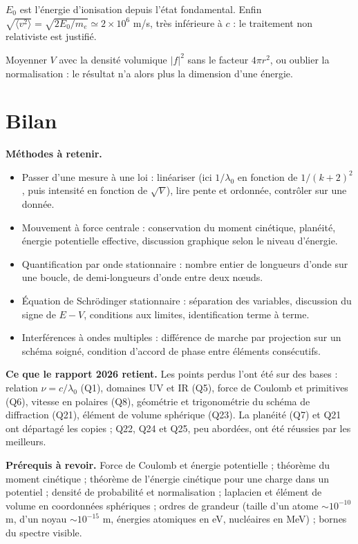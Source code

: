 \documentclass[11pt,a4paper]{article}
\providecommand{\tightlist}{\setlength{\itemsep}{0pt}\setlength{\parskip}{0pt}}
\begin{document}
\(E_0\) est l'énergie d'ionisation depuis l'état fondamental. Enfin \(\sqrt{\langle v^2\rangle}=\sqrt{2E_0/m_e}\simeq2\times10^6\) m/s, très inférieure à \(c\) : le traitement non relativiste est justifié.

\begin{piege}

Moyenner \(V\) avec la densité volumique \(|f|^2\) sans le facteur \(4\pi r^2\), ou oublier la normalisation : le résultat n'a alors plus la dimension d'une énergie.

\end{piege}

\hypertarget{bilan}{%
\section{Bilan}\label{bilan}}

\textbf{Méthodes à retenir.}

\begin{itemize}
\tightlist
\item
  Passer d'une mesure à une loi : linéariser (ici \(1/\lambda_0\) en fonction de \(1/(k+2)^2\), puis intensité en fonction de \(\sqrt V\)), lire pente et ordonnée, contrôler sur une donnée.
\item
  Mouvement à force centrale : conservation du moment cinétique, planéité, énergie potentielle effective, discussion graphique selon le niveau d'énergie.
\item
  Quantification par onde stationnaire : nombre entier de longueurs d'onde sur une boucle, de demi-longueurs d'onde entre deux nœuds.
\item
  Équation de Schrödinger stationnaire : séparation des variables, discussion du signe de \(E-V\), conditions aux limites, identification terme à terme.
\item
  Interférences à ondes multiples : différence de marche par projection sur un schéma soigné, condition d'accord de phase entre éléments consécutifs.
\end{itemize}

\textbf{Ce que le rapport 2026 retient.} Les points perdus l'ont été sur des bases : relation \(\nu=c/\lambda_0\) (Q1), domaines UV et IR (Q5), force de Coulomb et primitives (Q6), vitesse en polaires (Q8), géométrie et trigonométrie du schéma de diffraction (Q21), élément de volume sphérique (Q23). La planéité (Q7) et Q21 ont départagé les copies ; Q22, Q24 et Q25, peu abordées, ont été réussies par les meilleurs.

\textbf{Prérequis à revoir.} Force de Coulomb et énergie potentielle ; théorème du moment cinétique ; théorème de l'énergie cinétique pour une charge dans un potentiel ; densité de probabilité et normalisation ; laplacien et élément de volume en coordonnées sphériques ; ordres de grandeur (taille d'un atome \(\sim10^{-10}\) m, d'un noyau \(\sim10^{-15}\) m, énergies atomiques en eV, nucléaires en MeV) ; bornes du spectre visible.
\end{document}
